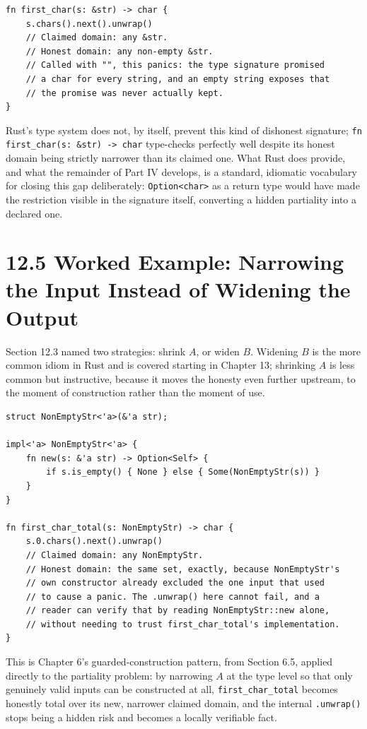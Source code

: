 \documentclass[11pt]{book}
\begin{document}
\begin{lstlisting}
fn first_char(s: &str) -> char {
    s.chars().next().unwrap()
    // Claimed domain: any &str.
    // Honest domain: any non-empty &str.
    // Called with "", this panics: the type signature promised
    // a char for every string, and an empty string exposes that
    // the promise was never actually kept.
}
\end{lstlisting}

Rust's type system does not, by itself, prevent this kind of dishonest signature; \texttt{fn first\_char(s: \&str) -> char} type-checks perfectly well despite its honest domain being strictly narrower than its claimed one. What Rust does provide, and what the remainder of Part IV develops, is a standard, idiomatic vocabulary for closing this gap deliberately: \texttt{Option<char>} as a return type would have made the restriction visible in the signature itself, converting a hidden partiality into a declared one.

\section*{12.5 Worked Example: Narrowing the Input Instead of Widening the Output}

Section 12.3 named two strategies: shrink $A$, or widen $B$. Widening $B$ is the more common idiom in Rust and is covered starting in Chapter 13; shrinking $A$ is less common but instructive, because it moves the honesty even further upstream, to the moment of construction rather than the moment of use.

\begin{lstlisting}
struct NonEmptyStr<'a>(&'a str);

impl<'a> NonEmptyStr<'a> {
    fn new(s: &'a str) -> Option<Self> {
        if s.is_empty() { None } else { Some(NonEmptyStr(s)) }
    }
}

fn first_char_total(s: NonEmptyStr) -> char {
    s.0.chars().next().unwrap()
    // Claimed domain: any NonEmptyStr.
    // Honest domain: the same set, exactly, because NonEmptyStr's
    // own constructor already excluded the one input that used
    // to cause a panic. The .unwrap() here cannot fail, and a
    // reader can verify that by reading NonEmptyStr::new alone,
    // without needing to trust first_char_total's implementation.
}
\end{lstlisting}

This is Chapter 6's guarded-construction pattern, from Section 6.5, applied directly to the partiality problem: by narrowing $A$ at the type level so that only genuinely valid inputs can be constructed at all, \texttt{first\_char\_total} becomes honestly total over its new, narrower claimed domain, and the internal \texttt{.unwrap()} stops being a hidden risk and becomes a locally verifiable fact.
\end{document}
